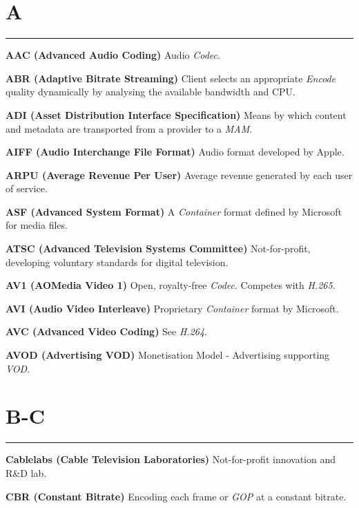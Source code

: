 
\section{A}
\hrule

\medskip
\textbf{AAC (Advanced Audio Coding)}
Audio \textit{Codec}.

\smallskip
\textbf{ABR (Adaptive Bitrate Streaming)}
Client selects an appropriate \textit{Encode} quality dynamically by analysing the available bandwidth and CPU.

\smallskip
\textbf{ADI (Asset Distribution Interface Specification)}
Means by which content and metadata are transported from a provider to a \textit{MAM}.

\smallskip
\textbf{AIFF (Audio Interchange File Format)}
Audio format developed by Apple.

\smallskip
\textbf{ARPU (Average Revenue Per User)}
Average revenue generated by each user of service.

\smallskip
\textbf{ASF (Advanced System Format)}
A \textit{Container} format defined by Microsoft for media files.

\smallskip
\textbf{ATSC (Advanced Television Systems Committee)}
Not-for-profit, developing voluntary standards for digital television.

\smallskip
\textbf{AV1 (AOMedia Video 1)}
Open, royalty-free \textit{Codec}. Competes with \textit{H.265}.

\smallskip
\textbf{AVI (Audio Video Interleave)}
Proprietary \textit{Container} format by Microsoft.

\smallskip
\textbf{AVC (Advanced Video Coding)}
See \textit{H.264}.

\smallskip
\textbf{AVOD (Advertising VOD)}
Monetisation Model - Advertising supporting \textit{VOD}.


\section{B-C}
\hrule

\medskip
\textbf{Cablelabs (Cable Television Laboratories)}
Not-for-profit innovation and R\&D lab.

\smallskip
\textbf{CBR (Constant Bitrate)}
Encoding each frame or \textit{GOP} at a constant bitrate.

